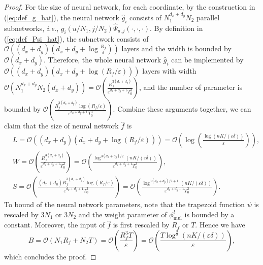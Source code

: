 \documentclass{article}
\numberwithin{equation}{section}
\def\eqref#1{equation~\ref{#1}}
\theoremstyle{definition}
\renewcommand{\eqref}[1]{(\ref{#1})}
\begin{document}
\begin{proof}
    For the size of neural network, for each coordinate, by the construction in \eqref{eq:def_g_hat}, the neural network $\widehat{g}_i$ consists of $N_1^{d_x+d_y}N_2$ parallel subnetworks, \textit{i.e.}, $g_i(u/N_1,j/N_2)\widehat{\Psi}_{u,j}(\cdot,\cdot,\cdot)$. By definition in \eqref{eq:def_Psi_hat}, the subnetwork consists of $\mathcal{O}\left((d_x+d_y)(d_x+d_y+\log\frac{R_f}{\varepsilon})\right)$ layers and the width is bounded by $\mathcal{O}(d_x+d_y)$.
    Therefore, the whole neural network $\widehat{g}_i$ can be implemented by $\mathcal{O}\left((d_x+d_y)(d_x+d_y+\log(R_f/\varepsilon))\right)$ layers with width $\mathcal{O}\left(N_1^{d_x+d_y}N_2(d_x+d_y)\right)=\mathcal{O}\left(\frac{R_f^{3(d_x+d_y)}}{\varepsilon^{d_x+d_y+1}T_0^3}\right)$, and the number of parameter is bounded by $\mathcal{O}\left(\frac{R_f^{3(d_x+d_y)}\log(R_f/\varepsilon)}{\varepsilon^{d_x+d_y+1}T_0^3}\right)$.
    Combine these arguments together, we can claim that the size of neural network $\widehat{f}$ is
    \begin{equation}
        \begin{aligned}
            &L=\mathcal{O}\left((d_x+d_y)(d_x+d_y+\log(R_f/\varepsilon))\right)=\mathcal{O}\left(\log\left(\frac{\log(nK/(\varepsilon\delta))}{\varepsilon}\right)\right), \\
            &W=\mathcal{O}\left(\frac{R_f^{3(d_x+d_y)}}{\varepsilon^{d_x+d_y+1}T_0^3}\right)=\mathcal{O}\left(\frac{\log^{3(d_x+d_y)/2}(nK/(\varepsilon\delta))}{\varepsilon^{d_x+d_y+1}T_0^3}\right),\\
            &S=\mathcal{O}\left(\frac{(d_x+d_y)R_f^{3(d_x+d_y)}\log(R_f/\varepsilon)}{\varepsilon^{d_x+d_y+1}T_0^3}\right)=\mathcal{O}\left(\frac{\log^{3(d_x+d_y)/2+1}(nK/(\varepsilon\delta))}{\varepsilon^{d_x+d_y+1}T_0^3}\right).
        \end{aligned}
    \end{equation}
    To bound of the neural network parameters, note that the trapezoid function $\psi$ is rescaled by $3N_1$ or $3N_2$ and the weight parameter of $\phi_{\text{mul}}^l$ is bounded by a constant. 
    Moreover, the input of $\widehat{f}$ is first rescaled by $R_f$ or $T$. 
    Hence we have
    \begin{equation}
        B=\mathcal{O}\left(N_1R_f+N_2T\right)=\mathcal{O}\left(\frac{R_f^3T}{\varepsilon}\right)=\mathcal{O}\left(\frac{T\log^{\frac{3}{2}}(nK/(\varepsilon\delta))}{\varepsilon}\right),
    \end{equation}
    which concludes the proof. 
\end{proof}
\end{document}
